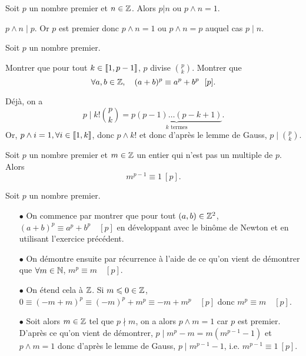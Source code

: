 \documentclass{magnolia}
\begin{document}
\begin{proposition}
Soit $p$ un nombre premier et $n\in\mathbb{Z}$. Alors $p|n$ ou $p\wedge n=1$.
\end{proposition}

\begin{preuve}
$p\wedge n \mid p$. Or $p$ est premier donc $p\wedge n=1$ ou $p\wedge n=p$ auquel cas $p\mid n$.
\end{preuve}

\begin{exoUnique}
\exo Soit $p$ un nombre premier.
\begin{questions}
\question Montrer que pour tout $k\in\left\llbracket 1,p-1\right\rrbracket$, $p$ divise $\binom{p}{k}$.
\question Montrer que
  \[\forall a,b\in\mathbb{Z},\quad (a+b)^p\equiv a^p + b^p\ \ [p].\]
\end{questions}
\end{exoUnique}
\begin{sol}
Déjà, on a $$p\mid k!\binom{p}{k}=\underbrace{p(p-1)\ldots (p-k+1)}_{k \text{ termes}}.$$
Or, $p\wedge i=1, \forall i \in \left\llbracket 1,k\right\rrbracket$, donc $p\wedge k!$ et donc d'après le lemme de Gauss, $p\mid \binom{p}{k}$.
\end{sol}

\begin{proposition}[nom={Petit théorème de \nom{Fermat}}]
Soit $p$ un nombre premier et $m\in\mathbb{Z}$ un entier qui n'est pas un multiple de
$p$. Alors
\[m^{p-1}\equiv 1\ [p].\]
\end{proposition}

\begin{preuve}
Soit $p$ un nombre premier.
\begin{itemize}
\item[$\bullet$] On commence par montrer que pour tout $(a,b)\in \mathbb{Z}^2$, $(a+b)^p\equiv a^p+b^p \quad [p]$ en développant avec le binôme de Newton et en utilisant l'exercice précédent.
\item[$\bullet$] On démontre ensuite par récurrence à l'aide de ce qu'on vient de démontrer que $\forall m \in \mathbb{N}$, $m^p\equiv m \quad [p]$.
\item[$\bullet$] On étend cela à $\mathbb{Z}$. Si $m\leqslant 0\in \mathbb{Z}$, $0\equiv (-m+m)^p\equiv (-m)^p+m^p \equiv -m+m^p \quad [p]$ donc $m^p\equiv m \quad [p]$.
\item[$\bullet$] Soit alors $m\in \mathbb{Z}$ tel que $p\nmid m$, on a alors $p\wedge m=1$ car $p$ est premier. D'après ce qu'on vient de démontrer, $p\mid m^p-m=m(m^{p-1}-1)$ et $p\wedge m=1$ donc d'après le lemme de Gauss, $p\mid m^{p-1}-1$, i.e. $m^{p-1}\equiv 1\ [p]$.
\end{itemize}
\end{preuve}
\end{document}
